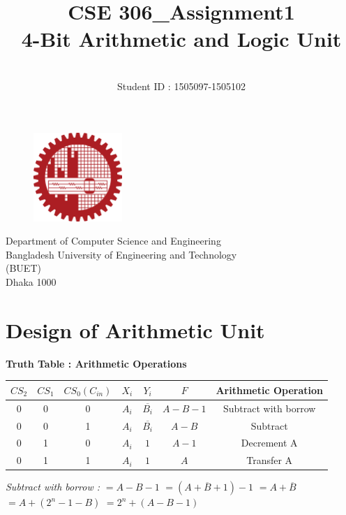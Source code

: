 \documentclass[]{article}
\title{CSE 306\_Assignment1 \\
4-Bit Arithmetic and Logic Unit}
\author{ \\ Student ID : 1505097-1505102}
\begin{document}
\maketitle

\vspace{5cm}

\begin{figure}[h!]
    \centering
    \includegraphics[width = 0.3\textwidth]{logo.png}
    \label{fig:bl}
\end{figure}
\begin{center}
   \Large{ Department of Computer Science and Engineering
 \\ Bangladesh University of Engineering and Technology
 \\ (BUET) \\
Dhaka 1000 \\}

\end{center}



\newpage
	\section{Design of Arithmetic Unit}
	
	\textbf{Truth Table : Arithmetic Operations}
	\begin{center}
		\begin{tabular}{ |c|c|c|c|c|c|c| } 
			\hline
			$CS_2$ & $CS_1$ & $CS_0(C_{in})$ & $X_i$ & $Y_i$ & $F$ & Arithmetic Operation  \\
			\hline
			
			\hline
			0 & 0 & 0 & $A_i$ & $\overline{B_i}$ & $A-B-1$ & Subtract with borrow \\
			\hline

			\hline
			0 & 0 & 1 & $A_i$ &$\overline{B_i}$ & $A-B$ & Subtract \\
			\hline
			
			\hline
			0 & 1 & 0 & $A_i$ & $1$ & $A-1$ & Decrement A \\
			\hline
			
			\hline
			0 & 1 & 1 & $A_i$ & $1$ & $A$ & Transfer A \\
			\hline
			
		\end{tabular}
	\end{center}
	\noindent\textit{Subtract with borrow :}\newline
	$=A-B-1$ \newline
	$=(A+\overline{B}+1)-1$ \newline
	$=A+\overline{B}$ \newline
	$=A+(2^n-1-B)$\newline
	$=2^n+(A-B-1)$\newline
\end{document}
